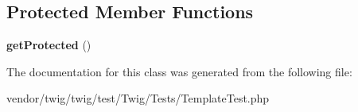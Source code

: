 \subsection*{Protected Member Functions}
\begin{DoxyCompactItemize}
\item 
{\bfseries get\+Protected} ()\hypertarget{classTwig__TemplateMethodObject_ac19bb5a4a56d5c6786bfbb23a0cd5e4d}{}\label{classTwig__TemplateMethodObject_ac19bb5a4a56d5c6786bfbb23a0cd5e4d}

\end{DoxyCompactItemize}


The documentation for this class was generated from the following file\+:\begin{DoxyCompactItemize}
\item 
vendor/twig/twig/test/\+Twig/\+Tests/Template\+Test.\+php\end{DoxyCompactItemize}
